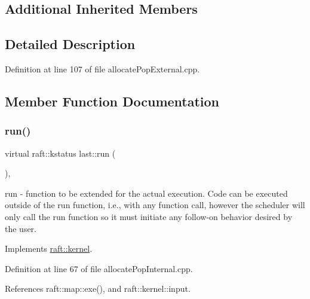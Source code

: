 \subsection*{Additional Inherited Members}


\subsection{Detailed Description}


Definition at line 107 of file allocate\+Pop\+External.\+cpp.



\subsection{Member Function Documentation}
\hypertarget{classlast_a7a1da1c30f571a8e8ccb515ca2cb2f02}{}\label{classlast_a7a1da1c30f571a8e8ccb515ca2cb2f02} 
\subsubsection{\texorpdfstring{run()}{run()}\hspace{0.1cm}{\footnotesize\ttfamily [1/6]}}
{\footnotesize\ttfamily virtual raft\+::kstatus last\+::run (\begin{DoxyParamCaption}{ }\end{DoxyParamCaption})\hspace{0.3cm}{\ttfamily [inline]}, {\ttfamily [virtual]}}

run -\/ function to be extended for the actual execution. Code can be executed outside of the run function, i.\+e., with any function call, however the scheduler will only call the run function so it must initiate any follow-\/on behavior desired by the user. 

Implements \hyperlink{classraft_1_1kernel_a05094286d7577360fb1b91c91fc05901}{raft\+::kernel}.



Definition at line 67 of file allocate\+Pop\+Internal.\+cpp.



References raft\+::map\+::exe(), and raft\+::kernel\+::input.



